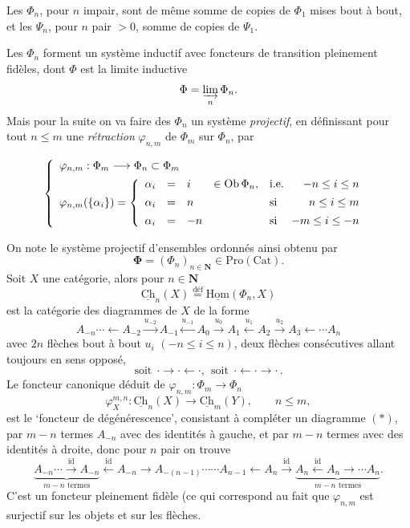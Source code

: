 \documentclass[11pt]{article}
\newcommand{\printedpage}[1]{\marginpar{\footnotesize p.~#1}}
\newcommand{\msp}[1]{\marginpar{\footnotesize [#1]}}
\newcommand{\uHom}{\underline{\mathrm{Hom}}}
\newcommand{\Ob}{\mathrm{Ob}\,}
\newcommand{\uCh}{\underline{\mathrm{Ch}}}
\newcommand{\bPhi}{\boldsymbol{\Phi}}
\begin{document}
Les $\Phi_n$, pour $n$ impair, sont de même somme de copies de $\Phi_1$ mises bout à bout, et les $\Psi_n$, pour $n$ pair $>0$, somme de copies de $\Psi_1$.

\clearpage

\printedpage{2}

Les $\Phi_n$ forment un système inductif avec foncteurs de transition pleinement fidèles, dont $\Phi$ est la limite inductive
\[
\Phi=\varinjlim_n\Phi_n.
\]
Mais pour la suite on va faire des $\Phi_n$ un système \textit{projectif}, en définissant pour tout $n\le m$ une \textit{rétraction} $\varphi_{n,m}$ de $\Phi_m$ sur $\Phi_n$, par

\msp{page 2}
\[
\left\{
\begin{array}{l}
\varphi_{n,m}:\Phi_m\longrightarrow\Phi_n\subset\Phi_m\\[1ex]
\varphi_{n,m}(\{\alpha_i\})=
\left\{
\begin{array}{rcll@{\quad}l@{\ \ }r}
\alpha_i & = & i & \in\Ob\Phi_n, & \text{i.e.} & -n\le i\le n\\[1ex]
\alpha_i & = & n & & \text{si} & n\le i\le m\\[1ex]
\alpha_i & = & -n & & \text{si} & -m\le i\le -n
\end{array}
\right.
\end{array}
\right.
\]

On note le système projectif d'ensembles ordonnés ainsi obtenu par
\[
\bPhi=(\Phi_n)_{n\in\mathbf{N}}\in\mathrm{Pro}(\mathrm{Cat}).
\]
Soit $X$ une catégorie, alors pour $n\in\mathbf{N}$
\[
\uCh_n(X)\overset{\text{déf}}{=}\uHom(\Phi_n,X)
\]
est la catégorie des diagrammes de $X$ de la forme
\[
A_{-n}\cdots\longleftarrow A_{-2}\xrightarrow{u_{-2}}A_{-1}\xleftarrow{u_{-1}}A_0\xrightarrow{u_0}A_1\xleftarrow{u_1}A_2\xrightarrow{u_2}A_3\longleftarrow\cdots A_n
\tag*{$(*)$}
\]
avec $2n$ flèches bout à bout $u_i$ $(-n\le i\le n)$, deux flèches consécutives allant toujours en sens opposé,
\[
\text{soit}\ \ \cdot\longrightarrow\cdot\longleftarrow\cdot,\ \ \text{soit}\ \ \cdot\longleftarrow\cdot\longrightarrow\cdot\,.
\]
Le foncteur canonique déduit de $\varphi_{n,m}:\Phi_m\longrightarrow\Phi_n$
\[
\varphi_X^{m,n}:\uCh_n(X)\longrightarrow\uCh_m(Y),\qquad n\le m,
\]
\printedpage{3}
 est le `foncteur de dégénérescence', consistant à compléter un diagramme $(*)$, par $m-n$ termes $A_{-n}$ avec des identités à gauche, et par $m-n$ termes avec des identités à droite, donc pour $n$ pair on trouve
\[
\underbrace{A_{-n}\cdots\xrightarrow{\text{id}}A_{-n}}_{m-n\text{ termes}}\xleftarrow{\text{id}}A_{-n}\longrightarrow A_{-(n-1)}\cdots\cdots A_{n-1}\longleftarrow A_n\xrightarrow{\text{id}}\underbrace{A_n\xleftarrow{\text{id}}A_n\longrightarrow\cdots A_n}_{m-n\text{ termes}}.
\]
C'est un foncteur pleinement fidèle (ce qui correspond au fait que $\varphi_{n,m}$ est surjectif sur les objets et sur les flèches. %
\end{document}
